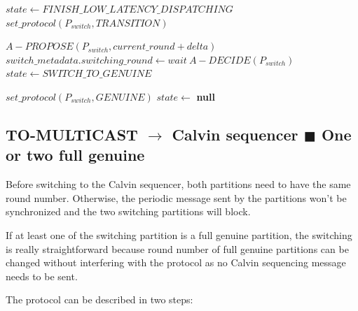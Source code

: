 \documentclass[a4paper, 10pt]{article}
\begin{document}
\begin{algorithmic}[1]
    \label{alg:line:gen:transition}
        \State $state \gets FINISH\_LOW\_LATENCY\_DISPATCHING$
        \State $set\_protocol(P_{switch}, TRANSITION)$
    \EndUpon\label{alg:line:gen:transition:end}

    \label{alg:line:gen:round}
        \State $A-PROPOSE(P_{switch}, current\_round + delta)$
        \State $switch\_metadata.switching\_round \gets wait\ A-DECIDE(P_{switch})$
        \State $state \gets SWITCH\_TO\_GENUINE$
    \EndUpon\label{alg:line:gen:round:end}

     \label{alg:line:gen:switch}
        \State $set\_protocol(P_{switch}, GENUINE)$
        \State $state \gets$ \textbf{null}
     \EndUpon\label{alg:line:gen:switch:end}
\end{algorithmic}

\subsection{TO-MULTICAST $\rightarrow$ Calvin sequencer {\tiny$\blacksquare$} One or two full genuine}\label{sec:genuine-to-calvin-full-genuine}

Before switching to the Calvin sequencer, both partitions need to have the same round number. Otherwise,
the periodic message sent by the partitions won't be synchronized and the two switching partitions will block.

If at least one of the switching partition is a full genuine partition, the switching is really straightforward because
round number of full genuine partitions can be changed without interfering with the protocol as no Calvin sequencing
message needs to be sent.

The protocol can be described in two steps:
\end{document}
